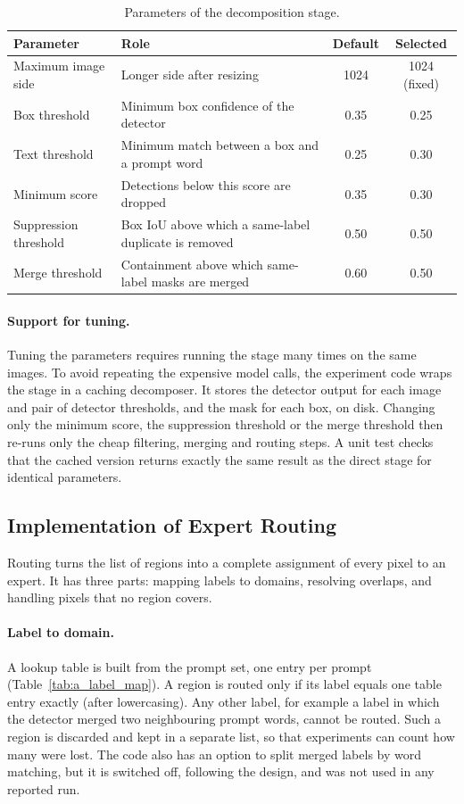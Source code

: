 \documentclass{FastFyp}
\begin{document}
\begin{table}[!ht]
\centering
\caption{Parameters of the decomposition stage.}
\label{tab:a_params}
\begin{tabular}{|p{3cm}|p{4.8cm}|c|c|}
\hline
\textbf{Parameter} & \textbf{Role} & \textbf{Default} & \textbf{Selected} \\ \hline
Maximum image side & Longer side after resizing & 1024 & 1024 (fixed) \\ \hline
Box threshold & Minimum box confidence of the detector & 0.35 & 0.25 \\ \hline
Text threshold & Minimum match between a box and a prompt word & 0.25 & 0.30 \\ \hline
Minimum score & Detections below this score are dropped & 0.35 & 0.30 \\ \hline
Suppression threshold & Box IoU above which a same-label duplicate is removed & 0.50 & 0.50 \\ \hline
Merge threshold & Containment above which same-label masks are merged & 0.60 & 0.50 \\ \hline
\end{tabular}
\end{table}

\paragraph{Support for tuning.} Tuning the parameters requires running the stage many times on the same images. To avoid repeating the expensive model calls, the experiment code wraps the stage in a caching decomposer. It stores the detector output for each image and pair of detector thresholds, and the mask for each box, on disk. Changing only the minimum score, the suppression threshold or the merge threshold then re-runs only the cheap filtering, merging and routing steps. A unit test checks that the cached version returns exactly the same result as the direct stage for identical parameters.
 
\subsection{Implementation of Expert Routing}
\label{sec:a_routing}
Routing turns the list of regions into a complete assignment of every pixel to an expert. It has three parts: mapping labels to domains, resolving overlaps, and handling pixels that no region covers.

\paragraph{Label to domain.} A lookup table is built from the prompt set, one entry per prompt (Table~\ref{tab:a_label_map}). A region is routed only if its label equals one table entry exactly (after lowercasing). Any other label, for example a label in which the detector merged two neighbouring prompt words, cannot be routed. Such a region is discarded and kept in a separate list, so that experiments can count how many were lost. The code also has an option to split merged labels by word matching, but it is switched off, following the design, and was not used in any reported run.
\end{document}
